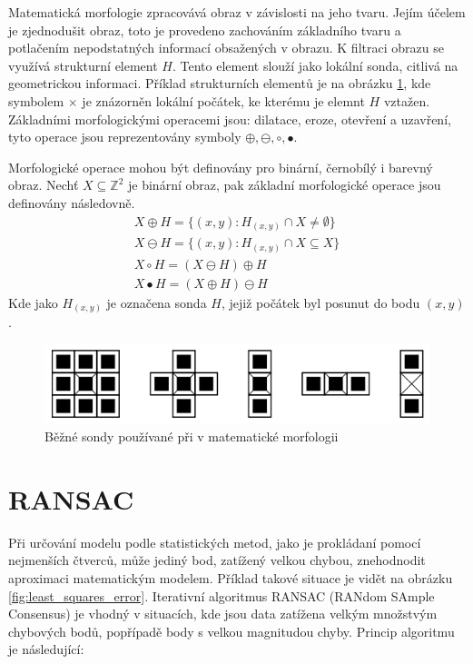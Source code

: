 \documentclass[twoside]{ctuthesis}
\begin{document}
Matematická morfologie zpracovává obraz v závislosti na jeho tvaru. Jejím účelem je zjednodušit obraz, toto je provedeno zachováním základního tvaru a potlačením nepodstatných informací obsažených v obrazu.\cite{haralick1987image} K filtraci obrazu se využívá strukturní element $H$. Tento element slouží jako lokální sonda, citlivá na geometrickou informaci. Příklad strukturních elementů je na obrázku \ref{fig:sondy}, kde symbolem $\times$ je znázorněn lokální počátek, ke kterému je elemnt $H$ vztažen. Základními morfologickými operacemi jsou: dilatace, eroze, otevření a uzavření, tyto operace jsou reprezentovány symboly $\oplus, \ominus, \circ, \bullet$.


Morfologické operace mohou být definovány pro binární, černobílý i barevný obraz. Nechť $X \subseteq \mathbb{Z}^2$ je binární obraz, pak základní morfologické operace jsou definovány následovně.\cite{comer1999morphological}
\begin{align}
    X \oplus H = \{ (x,y): H_{(x,y)} \cap X \neq \emptyset \} \\
    X \ominus H = \{ (x,y): H_{(x,y)} \cap X \subseteq X \} \\
    X \circ H = (X \ominus H) \oplus H \\
    X \bullet H = (X \oplus H) \ominus H
\end{align}
Kde jako $H_{(x,y)}$ je označena sonda $H$, jejiž počátek byl posunut do bodu $(x,y)$.

\begin{figure}
    \centering
    \includegraphics[width = \linewidth]{pictures/sondy_morfologie.png}
    \caption{Běžné sondy používané při v matematické morfologii}
    \label{fig:sondy}
\end{figure}

\section{RANSAC}
\label{sec:ransac}
Při určování modelu podle statistických metod, jako je prokládaní pomocí nejmenších čtverců, může jediný bod, zatížený velkou chybou, znehodnodit aproximaci matematickým modelem. Příklad takové situace je vidět na obrázku \ref{fig:least_squares_error}.
Iterativní algoritmus RANSAC (RANdom SAmple Consensus) je vhodný v situacích, kde jsou data zatížena velkým množstvým chybových bodů, popřípadě body s velkou magnitudou chyby. Princip algoritmu je následující: \cite{derpanis2010overview}
\end{document}
